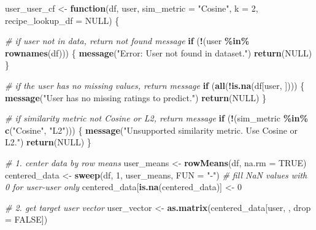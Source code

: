 \documentclass[
]{article}
\newenvironment{Shaded}{\begin{snugshade}}{\end{snugshade}}
\newcommand{\AttributeTok}[1]{\textcolor[rgb]{0.13,0.29,0.53}{#1}}
\newcommand{\CommentTok}[1]{\textcolor[rgb]{0.56,0.35,0.01}{\textit{#1}}}
\newcommand{\ConstantTok}[1]{\textcolor[rgb]{0.56,0.35,0.01}{#1}}
\newcommand{\ControlFlowTok}[1]{\textcolor[rgb]{0.13,0.29,0.53}{\textbf{#1}}}
\newcommand{\DecValTok}[1]{\textcolor[rgb]{0.00,0.00,0.81}{#1}}
\newcommand{\FunctionTok}[1]{\textcolor[rgb]{0.13,0.29,0.53}{\textbf{#1}}}
\newcommand{\NormalTok}[1]{#1}
\newcommand{\OtherTok}[1]{\textcolor[rgb]{0.56,0.35,0.01}{#1}}
\newcommand{\SpecialCharTok}[1]{\textcolor[rgb]{0.81,0.36,0.00}{\textbf{#1}}}
\newcommand{\StringTok}[1]{\textcolor[rgb]{0.31,0.60,0.02}{#1}}
\begin{document}
\begin{Shaded}
\begin{Highlighting}[]
\NormalTok{user\_user\_cf }\OtherTok{\textless{}{-}} \ControlFlowTok{function}\NormalTok{(df, user, }\AttributeTok{sim\_metric =} \StringTok{"Cosine"}\NormalTok{, }\AttributeTok{k =} \DecValTok{2}\NormalTok{, }
                         \AttributeTok{recipe\_lookup\_df =} \ConstantTok{NULL}\NormalTok{) \{}
  
  \CommentTok{\# if user not in data, return not found message}
  \ControlFlowTok{if}\NormalTok{ (}\SpecialCharTok{!}\NormalTok{(user }\SpecialCharTok{\%in\%} \FunctionTok{rownames}\NormalTok{(df))) \{}
    \FunctionTok{message}\NormalTok{(}\StringTok{"Error: User not found in dataset."}\NormalTok{)}
    \FunctionTok{return}\NormalTok{(}\ConstantTok{NULL}\NormalTok{)}
\NormalTok{  \}}

  \CommentTok{\# if the user has no missing values, return message}
  \ControlFlowTok{if}\NormalTok{ (}\FunctionTok{all}\NormalTok{(}\SpecialCharTok{!}\FunctionTok{is.na}\NormalTok{(df[user, ]))) \{}
    \FunctionTok{message}\NormalTok{(}\StringTok{"User has no missing ratings to predict."}\NormalTok{)}
    \FunctionTok{return}\NormalTok{(}\ConstantTok{NULL}\NormalTok{)}
\NormalTok{  \}}

  \CommentTok{\# if similarity metric not Cosine or L2, return message}
  \ControlFlowTok{if}\NormalTok{ (}\SpecialCharTok{!}\NormalTok{(sim\_metric }\SpecialCharTok{\%in\%} \FunctionTok{c}\NormalTok{(}\StringTok{"Cosine"}\NormalTok{, }\StringTok{"L2"}\NormalTok{))) \{}
    \FunctionTok{message}\NormalTok{(}\StringTok{"Unsupported similarity metric. Use \textquotesingle{}Cosine\textquotesingle{} or \textquotesingle{}L2\textquotesingle{}."}\NormalTok{)}
    \FunctionTok{return}\NormalTok{(}\ConstantTok{NULL}\NormalTok{)}
\NormalTok{  \}}

  \CommentTok{\# 1. center data by row means}
\NormalTok{  user\_means }\OtherTok{\textless{}{-}} \FunctionTok{rowMeans}\NormalTok{(df, }\AttributeTok{na.rm =} \ConstantTok{TRUE}\NormalTok{)}
\NormalTok{  centered\_data }\OtherTok{\textless{}{-}} \FunctionTok{sweep}\NormalTok{(df, }\DecValTok{1}\NormalTok{, user\_means, }\AttributeTok{FUN =} \StringTok{"{-}"}\NormalTok{)}
  \CommentTok{\# fill NaN values with 0 for user{-}user only}
\NormalTok{  centered\_data[}\FunctionTok{is.na}\NormalTok{(centered\_data)] }\OtherTok{\textless{}{-}} \DecValTok{0}  

  \CommentTok{\# 2. get target user vector}
\NormalTok{  user\_vector }\OtherTok{\textless{}{-}} \FunctionTok{as.matrix}\NormalTok{(centered\_data[user, , }\AttributeTok{drop =} \ConstantTok{FALSE}\NormalTok{])}


\end{Highlighting}
\end{Shaded}
\end{document}

